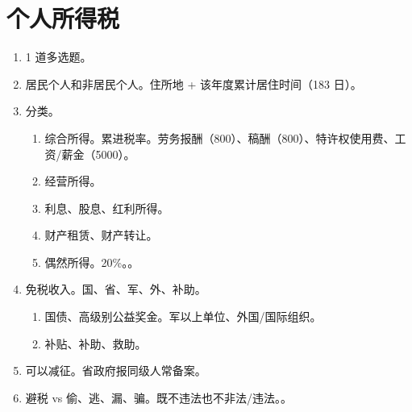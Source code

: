 \section{个人所得税}
\begin{enumerate}
  \item 1 道多选题。
  \item 居民个人和非居民个人。住所地 + 该年度累计居住时间（183 日）。
  \item 分类。
        \begin{enumerate}
          \item 综合所得。累进税率。劳务报酬（800）、稿酬（800）、特许权使用费、工资/薪金（5000）。
          \item 经营所得。
          \item 利息、股息、红利所得。
          \item 财产租赁、财产转让。
          \item 偶然所得。20\%。。
        \end{enumerate}
  \item 免税收入。国、省、军、外、补助。
        \begin{enumerate}
          \item 国债、高级别公益奖金。军以上单位、外国/国际组织。
          \item 补贴、补助、救助。
        \end{enumerate}
  \item 可以减征。省政府报同级人常备案。
  \item 避税 vs 偷、逃、漏、骗。既不违法也不非法/违法。。
\end{enumerate}
